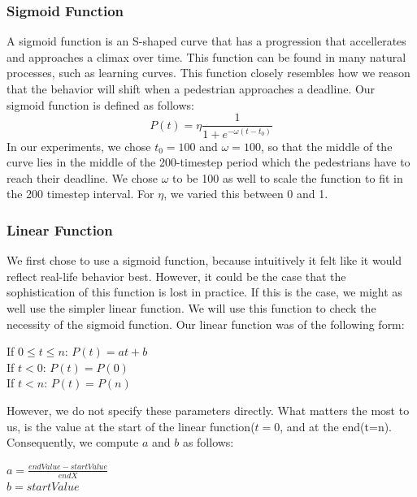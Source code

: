 \documentclass[11pt]{book}
\begin{document}
\subsubsection{Sigmoid Function}
A sigmoid function is an S-shaped curve that has a progression that accellerates and approaches a climax over time. This function can be found in many natural processes, such as learning curves. This function closely resembles how we reason that the behavior will shift when a pedestrian approaches a deadline.
Our sigmoid function is defined as follows:
\begin{equation}
P(t) = \eta \frac{1}{1+e^{-\omega(t-t_0)}}
\end{equation}
In our experiments, we chose $t_0=100$ and $\omega=100$, so that the middle of the curve lies in the middle of the 200-timestep period which the pedestrians have to reach their deadline. We chose $\omega$ to be 100 as well to scale the function to fit in the 200 timestep interval. For $\eta$, we varied this between 0 and 1.


\subsubsection{Linear Function}
We first chose to use a sigmoid function, because intuitively it felt like it would reflect real-life behavior best. However, it could be the case that the sophistication of this function is lost in practice. If this is the case, we might as well use the simpler linear function. We will use this function to check the necessity of the sigmoid function. Our linear function was of the following form:
\begin{center}
If $0 \leq t \leq n$: $P(t) = at + b$\\
If $t<0$: $P(t) = P(0)$\\
If $t<n$: $P(t) = P(n)$
\end{center}
However, we do not specify these parameters directly. What matters the most to us, is the value at the start of the linear function($t=0$, and at the end(t=n). Consequently, we compute $a$ and $b$ as follows:
\begin{center}
$a = \frac{endValue - startValue}{endX}$\\
$b = startValue$
\end{center}
\end{document}
